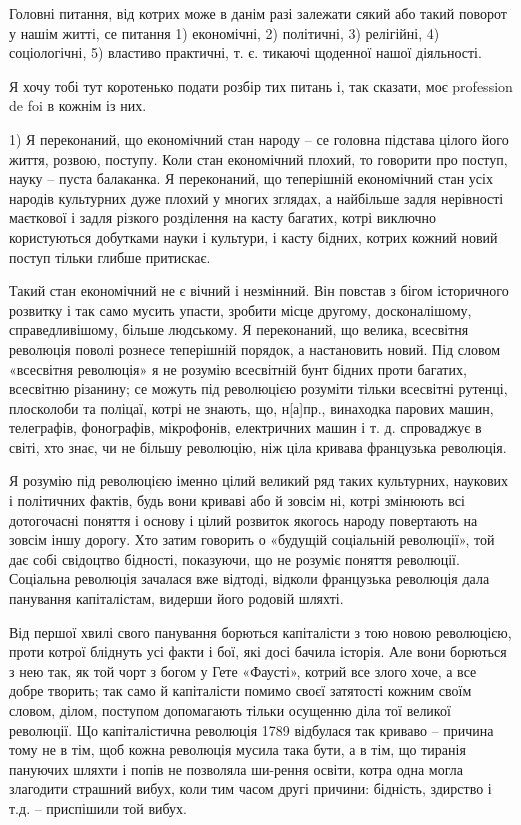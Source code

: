 Головні питання, від котрих може в данім разі залежати сякий або такий поворот у нашім житті, се питання 1) економічні, 2) політичні, 3) релігійні, 4) соціологічні, 5) властиво практичні, т. є. тикаючі щоденної нашої діяльності.

Я хочу тобі тут коротенько подати розбір тих питань і, так сказати, моє profession de foi в кожнім із них.

1) Я переконаний, що економічний стан народу – се головна підстава цілого його
життя, розвою, поступу. Коли стан економічний плохий, то говорити про поступ,
науку – пуста балаканка. Я переконаний, що теперішній економічний стан усіх
народів культурних дуже плохий у многих зглядах, а найбільше задля нерівності
маєткової і задля різкого розділення на касту багатих, котрі виключно
користуються добутками науки і культури, і касту бідних, котрих кожний новий
поступ тільки глибше притискає.

Такий стан економічний не є вічний і незмінний. Він повстав з бігом історичного
розвитку і так само мусить упасти, зробити місце другому, досконалішому,
справедливішому, більше людському. Я переконаний, що велика, всесвітня
революція поволі рознесе теперішній порядок, а настановить новий. Під словом
«всесвітня революція» я не розумію всесвітній бунт бідних проти багатих,
всесвітню різанину; се можуть під революцією розуміти тільки всесвітні рутенці,
плосколоби та поліцаї, котрі не знають, що, н[а]пр., винаходка парових машин,
телеграфів, фонографів, мікрофонів, електричних машин і т. д. спроваджує в
світі, хто знає, чи не більшу революцію, ніж ціла кривава французька революція.

Я розумію під революцією іменно цілий великий ряд таких культурних, наукових і політичних фактів, будь вони криваві або й зовсім ні, котрі змінюють всі дотогочасні поняття і основу і цілий розвиток якогось народу повертають на зовсім іншу дорогу. Хто затим говорить о «будущій соціальній революції», той дає собі свідоцтво бідності, показуючи, що не розуміє поняття революції. Соціальна революція зачалася вже відтоді, відколи французька революція дала панування капіталістам, видерши його родовій шляхті.

Від першої хвилі свого панування борються капіталісти з тою новою революцією, проти котрої бліднуть усі факти і бої, які досі бачила історія. Але вони борються з нею так, як той чорт з богом у Гете «Фаусті», котрий все злого хоче, а все добре творить; так само й капіталісти помимо своєї затятості кожним своїм словом, ділом, поступом допомагають тільки осущенню діла тої великої революції. Що капіталістична революція 1789 відбулася так криваво – причина тому не в тім, щоб кожна революція мусила така бути, а в тім, що тиранія пануючих шляхти і попів не позволяла ши-рення освіти, котра одна могла злагодити страшний вибух, коли тим часом другі причини: бідність, здирство і т.д. – приспішили той вибух.


